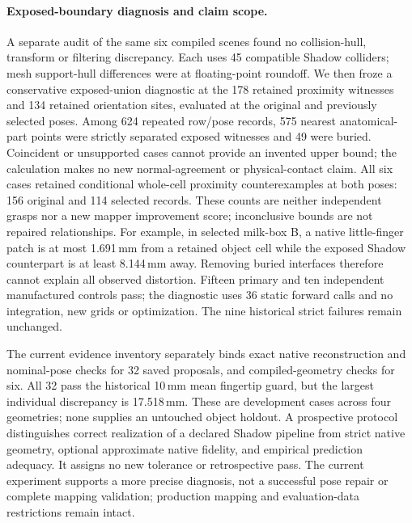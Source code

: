 \paragraph{Exposed-boundary diagnosis and claim scope.}
A separate audit of the same six compiled scenes found no collision-hull,
transform or filtering discrepancy. Each uses 45 compatible Shadow colliders;
mesh support-hull differences were at floating-point roundoff. We then froze a
conservative exposed-union diagnostic at the 178 retained proximity witnesses
and 134 retained orientation sites, evaluated at the original and previously
selected poses. Among 624 repeated row/pose records, 575 nearest anatomical-part
points were strictly separated exposed witnesses and 49 were buried. Coincident
or unsupported cases cannot provide an invented upper bound; the calculation
makes no new normal-agreement or physical-contact claim. All six cases retained
conditional whole-cell proximity counterexamples at both poses: 156 original
and 114 selected records. These counts are neither independent grasps nor a new
mapper improvement score; inconclusive bounds are not repaired relationships.
For example, in selected milk-box B, a native little-finger patch is at most
1.691\,mm from a retained object cell while the exposed Shadow counterpart is
at least 8.144\,mm away. Removing buried interfaces therefore cannot explain all
observed distortion. Fifteen primary and ten independent manufactured controls
pass; the diagnostic uses 36 static forward calls and no integration, new grids
or optimization. The nine historical strict failures remain unchanged.

The current evidence inventory separately binds exact native reconstruction and
nominal-pose checks for 32 saved proposals, and compiled-geometry checks for six.
All 32 pass the historical 10\,mm mean fingertip guard, but the largest individual
discrepancy is 17.518\,mm. These are development cases across four geometries;
none supplies an untouched object holdout. A prospective protocol distinguishes
correct realization of a declared Shadow pipeline from strict native geometry,
optional approximate native fidelity, and empirical prediction adequacy. It
assigns no new tolerance or retrospective pass. The current experiment supports
a more precise diagnosis, not a successful pose repair or complete mapping
validation; production mapping and evaluation-data restrictions remain intact.

